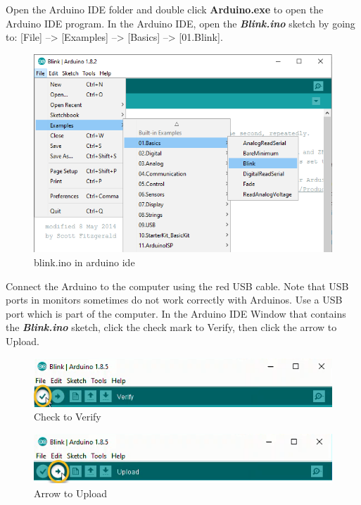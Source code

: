 \documentclass[11pt]{article}
\begin{document}
Open the Arduino IDE folder and double click \textbf{Arduino.exe} to
open the Arduino IDE program. In the Arduino IDE, open the
\textbf{\emph{Blink.ino}} sketch by going to: {[}File{]}
--\textgreater{} {[}Examples{]} --\textgreater{} {[}Basics{]}
--\textgreater{} {[}01.Blink{]}.

\begin{figure}
\centering
\includegraphics{images/blink_in_examples_menu.png}
\caption{blink.ino in arduino ide}
\end{figure}

Connect the Arduino to the computer using the red USB cable. Note that
USB ports in monitors sometimes do not work correctly with Arduinos. Use
a USB port which is part of the computer. In the Arduino IDE Window that
contains the \textbf{\emph{Blink.ino}} sketch, click the check mark to
Verify, then click the arrow to Upload.

\begin{figure}
\centering
\includegraphics{images/Check_to_Verify.png}
\caption{Check to Verify}
\end{figure}

\begin{figure}
\centering
\includegraphics{images/Arrow_to_Upload.png}
\caption{Arrow to Upload}
\end{figure}
\end{document}
